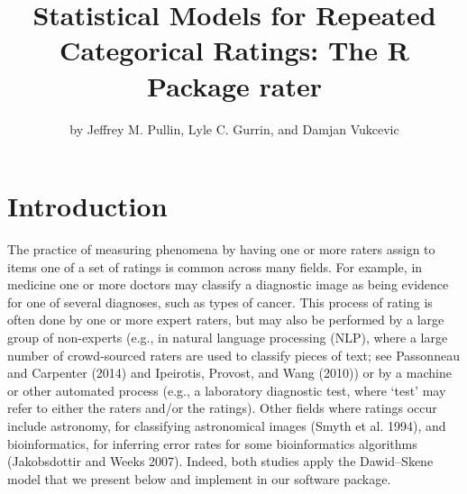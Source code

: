 \title{Statistical Models for Repeated Categorical Ratings: The R Package rater}


\author{by Jeffrey M. Pullin, Lyle C. Gurrin, and Damjan Vukcevic}

\maketitle


\hypertarget{sec:intro}{%
\section{Introduction}\label{sec:intro}}

The practice of measuring phenomena by having one or more raters assign to items
one of a set of ratings is common across many fields. For example, in medicine
one or more doctors may classify a diagnostic image as being evidence for one of
several diagnoses, such as types of cancer. This process of rating is often done
by one or more expert raters, but may also be performed by a
large group of non-experts (e.g., in natural language processing
(NLP), where a large number of crowd-sourced raters are used to classify
pieces of text; see Passonneau and Carpenter (2014) and Ipeirotis, Provost, and Wang (2010)) or by a machine
or other automated process (e.g., a laboratory diagnostic test, where `test'
may refer to either the raters and/or the ratings). Other fields where ratings
occur include astronomy, for classifying astronomical images (Smyth et al. 1994), and
bioinformatics, for inferring error rates for some bioinformatics algorithms
(Jakobsdottir and Weeks 2007). Indeed, both studies apply the Dawid--Skene model that we
present below and implement in our software package.

